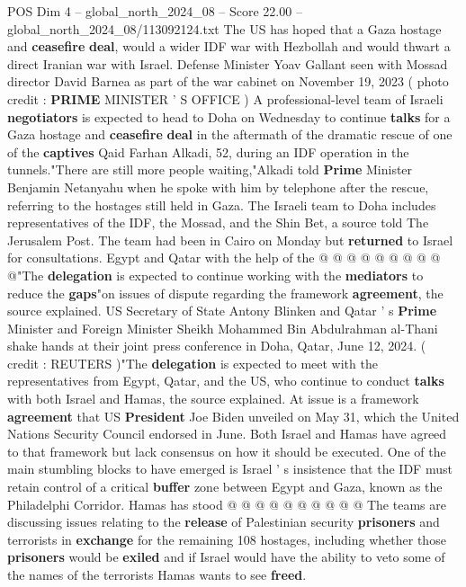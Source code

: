 \begin{textsample}{POS Dim 4 – global\_north\_2024\_08 – Score 22.00 – global\_north\_2024\_08/113092124.txt}  \label{ex:f4_pos_158}
The US has hoped that a Gaza hostage and \textbf{ceasefire} \textbf{deal}, would a wider IDF war with Hezbollah and would thwart a direct Iranian war with Israel.
Defense Minister Yoav Gallant seen with Mossad director David Barnea as part of the war cabinet on November 19, 2023 ( photo credit : \textbf{PRIME} MINISTER ' S OFFICE ) A professional-level team of Israeli \textbf{negotiators} is expected to head to Doha on Wednesday to continue \textbf{talks} for a Gaza hostage and \textbf{ceasefire} \textbf{deal} in the aftermath of the dramatic rescue of one of the \textbf{captives} Qaid Farhan Alkadi, 52, during an IDF operation in the tunnels."There are still more people waiting,"Alkadi told \textbf{Prime} Minister Benjamin Netanyahu when he spoke with him by telephone after the rescue, referring to the hostages still held in Gaza.
The Israeli team to Doha includes representatives of the IDF, the Mossad, and the Shin Bet, a source told The Jerusalem Post.
The team had been in Cairo on Monday but \textbf{returned} to Israel for consultations.
Egypt and Qatar with the help of the @ @ @ @ @ @ @ @ @ @"The \textbf{delegation} is expected to continue working with the \textbf{mediators} to reduce the \textbf{gaps}"on issues of dispute regarding the framework \textbf{agreement}, the source explained.
US Secretary of State Antony Blinken and Qatar ' s \textbf{Prime} Minister and Foreign Minister Sheikh Mohammed Bin Abdulrahman al-Thani shake hands at their joint press conference in Doha, Qatar, June 12, 2024. ( credit : REUTERS )"The \textbf{delegation} is expected to meet with the representatives from Egypt, Qatar, and the US, who continue to conduct \textbf{talks} with both Israel and Hamas, the source explained.
At issue is a framework \textbf{agreement} that US \textbf{President} Joe Biden unveiled on May 31, which the United Nations Security Council endorsed in June.
Both Israel and Hamas have agreed to that framework but lack consensus on how it should be executed.
One of the main stumbling blocks to have emerged is Israel ' s insistence that the IDF must retain control of a critical \textbf{buffer} zone between Egypt and Gaza, known as the Philadelphi Corridor.
Hamas has stood @ @ @ @ @ @ @ @ @ @ The teams are discussing issues relating to the \textbf{release} of Palestinian security \textbf{prisoners} and terrorists in \textbf{exchange} for the remaining 108 hostages, including whether those \textbf{prisoners} would be \textbf{exiled} and if Israel would have the ability to veto some of the names of the terrorists Hamas wants to see \textbf{freed}.

\end{textsample}

